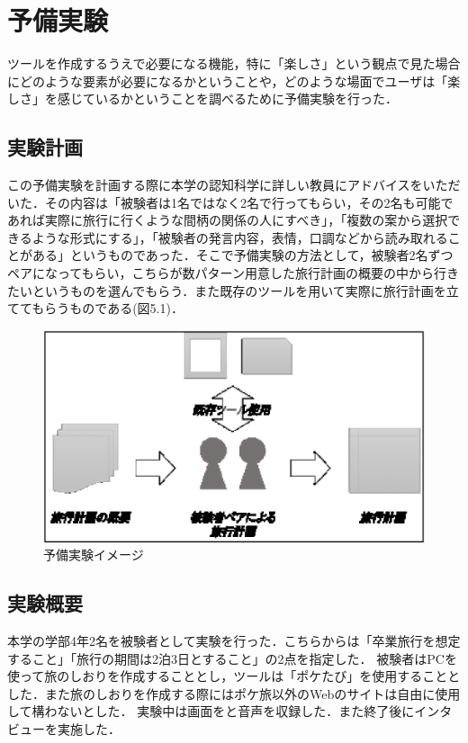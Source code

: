 \documentclass{funthesis}
\begin{document}
\chapter{予備実験}%
ツールを作成するうえで必要になる機能，特に「楽しさ」という観点で見た場合にどのような要素が必要になるかということや，どのような場面でユーザは「楽しさ」を感じているかということを調べるために予備実験を行った．

\section{実験計画}
この予備実験を計画する際に本学の認知科学に詳しい教員にアドバイスをいただいた．その内容は「被験者は1名ではなく2名で行ってもらい，その2名も可能であれば実際に旅行に行くような間柄の関係の人にすべき」，「複数の案から選択できるような形式にする」，「被験者の発言内容，表情，口調などから読み取れることがある」というものであった．そこで予備実験の方法として，被験者2名ずつペアになってもらい，こちらが数パターン用意した旅行計画の概要の中から行きたいというものを選んでもらう．また既存のツールを用いて実際に旅行計画を立ててもらうものである(図5.1)．
\begin{figure}[htpb]
\begin{center}
\includegraphics[scale=0.4]{semiexp.eps}
\end{center}
\caption{予備実験イメージ}
\end{figure}


\section{実験概要}
本学の学部4年2名を被験者として実験を行った．こちらからは「卒業旅行を想定すること」「旅行の期間は2泊3日とすること」の2点を指定した．
被験者はPCを使って旅のしおりを作成することとし，ツールは「ポケたび」を使用することとした．また旅のしおりを作成する際にはポケ旅以外のWebのサイトは自由に使用して構わないとした．
実験中は画面をと音声を収録した．また終了後にインタビューを実施した．
\end{document}
